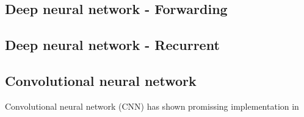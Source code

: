 \subsection{Deep neural network - Forwarding}
\subsection{Deep neural network - Recurrent}
\subsection{Convolutional neural network}
Convolutional neural network (CNN) has shown promissing implementation in 